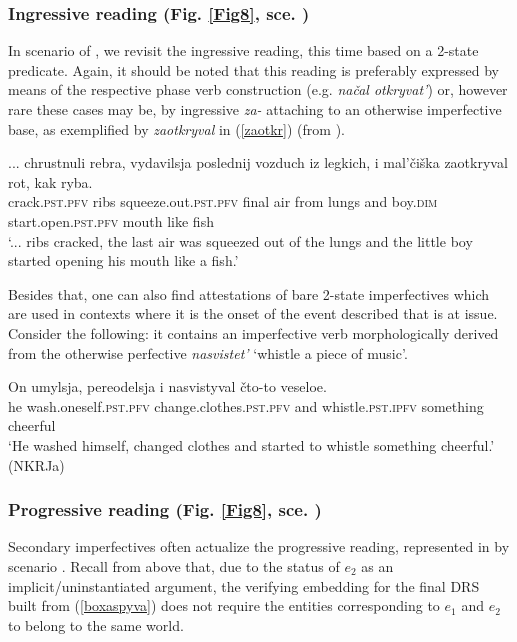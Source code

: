 \documentclass[output=paper,colorlinks,citecolor=brown]{langscibook}
\begin{document}
 \subsubsection{Ingressive reading (Fig. \ref{Fig8}, sce. )}
In scenario  of , we revisit the ingressive reading, this time based on a 2-state predicate.
Again, it should be noted that this reading is preferably expressed by means of the respective phase verb construction (e.g. \textit{načal otkryvat'}) or, however rare these cases may be, by ingressive \textit{za-} attaching to an otherwise imperfective base, as exemplified by \textit{zaotkryval} in (\ref{zaotkr}) (from \citealt[471]{Tate15}).

\ea\label{zaotkr}
\gll ... chrustnuli
rebra, vydavilsja 
poslednij vozduch iz legkich, i
mal'čiška zaotkryval
rot, kak ryba. \\ 
{} crack.\textsc{pst.pfv} ribs squeeze.out.\textsc{pst.pfv} final air from lungs and boy.\textsc{dim} start.open.\textsc{pst.pfv} mouth like fish \\
\glt `... ribs cracked, the last air was squeezed out of the lungs and the little boy started opening his mouth like a fish.' 
\z 

\noindent Besides that, one can also find attestations of bare 2-state imperfectives which are used in contexts where it is the onset of the event described that is at issue. Consider the following: it contains an imperfective verb morphologically derived from the otherwise perfective \textit{nasvistet'} `whistle a piece of music'.

\ea\label{plakal2}
\gll On umylsja, pereodelsja i nasvistyval čto-to veseloe.\\
he  wash.oneself.\textsc{pst.pfv} change.clothes.\textsc{pst.pfv} and whistle.\textsc{pst.ipfv} something cheerful\\
\glt `He washed himself, changed clothes and started to whistle something cheerful.' \hfill (NKRJa)
\z

\subsubsection{Progressive reading (Fig. \ref{Fig8}, sce. )}
Secondary imperfectives often actualize the progressive reading, represented in  by scenario .
Recall from above that, due to the status of $e_2$ as an implicit/uninstantia\-ted argument, the verifying embedding for 
the final DRS built from (\ref{boxaspyva}) does not require the entities corresponding to $e_1$ and $e_2$ to belong to the same world. 
\end{document}
